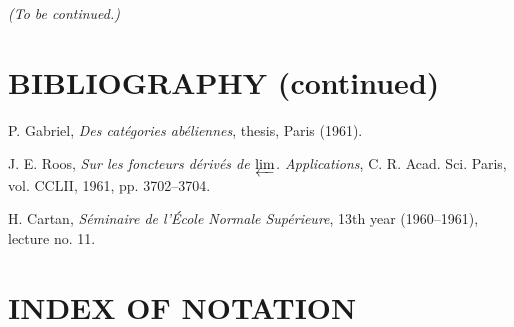 \bigskip
\noindent\emph{(To be continued.)}

\clearpage
\thispagestyle{empty}
\null
\clearpage
\thispagestyle{plain}

\section*{BIBLIOGRAPHY (continued)}

\begin{flushleft}
[27] P. Gabriel, \emph{Des catégories abéliennes}, thesis, Paris (1961).

\medskip
[28] J. E. Roos, \emph{Sur les foncteurs dérivés de $\varprojlim$.
Applications}, C. R. Acad. Sci. Paris, vol. CCLII, 1961, pp. 3702--3704.

\medskip
[29] H. Cartan, \emph{Séminaire de l'École Normale Supérieure},
13th year (1960--1961), lecture no. 11.
\end{flushleft}

\clearpage
{}
\section*{INDEX OF NOTATION}

